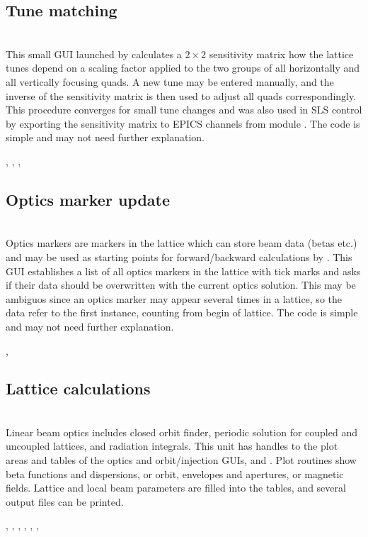 \documentclass[12pt]{article}
\newcommand\code[1]{{\tt #1}}
\newcommand{\opagui}[1]{\colorbox{blue!20}{{\color{black}\code{#1}}}}
\newcommand{\oguih}[2]{\subsection{\label{#2}#1}{\Huge\opagui{#2}}\\}
\newcommand{\ogui}[1]{\hyperref[#1]{\opagui{#1}}}
\newcommand{\opauni}[1]{\colorbox{orange!30}{{\color{black}\code{#1}}}}
\newcommand{\ounih}[2]{\subsection{\label{#2}#1}{\Huge\opauni{#2}}\\}
\newcommand{\ouni}[1]{\hyperref[#1]{\opauni{#1}}}
\newcommand{\uses}[1]{\flushleft {\bf Uses:} #1}
\newcommand{\desc}[1]{#1}
\begin{document}
\oguih{Tune matching}{otunematrix} 

This small GUI launched by \ogui{opalinop} calculates a $2\times 2$ sensitivity matrix how the lattice tunes depend on a scaling factor applied to the two groups of all horizontally and all vertically focusing quads. A new tune may be entered manually, and the inverse of the sensitivity matrix is then used to adjust all quads correspondingly. This procedure converges for small tune changes and was also used in SLS control by exporting the sensitivity matrix to EPICS channels from module \ogui{opacurrents}. The code is simple and may not need further explanation.

\uses{\ouni{linoplib}, \ouni{globlib}, \ouni{mathlib}, \ouni{comauxlib}} 


\oguih{Optics marker update}{owriteomrk} 
\desc{Optics markers are markers in the lattice which can store beam data (betas etc.) and may be used as starting points for forward/backward calculations by \ogui{ostartmenu}. This GUI establishes a list of all optics markers in the lattice with tick marks and asks if their data should be overwritten with the current optics solution. This may be ambiguos since an optics marker may appear several times in a lattice, so the data refer to the first instance, counting from begin of lattice. The code is simple and may not need further explanation.}

\uses{\ouni{globlib}, \ouni{comauxlib}} 




\ounih{Lattice calculations}{linoplib} 

\desc{Linear beam optics includes closed orbit finder, periodic solution for coupled and uncoupled lattices, and radiation integrals. 
This unit has handles to the plot areas and tables of the optics and orbit/injection GUIs, \ogui{opalinop} and \ogui{opaorbit}.
Plot routines show beta functions and dispersions, or orbit, envelopes and apertures, or magnetic fields. Lattice and local beam parameters are filled into the tables, and several output files can be printed. 
}


\uses{\ouni{globlib}, \ouni{varlib},
 \ouni{elemlib}, \ogui{opatunediag},  \ouni{mathlib}, \ouni{comvgraphlib}, \ouni{comauxlib}}
\end{document}
